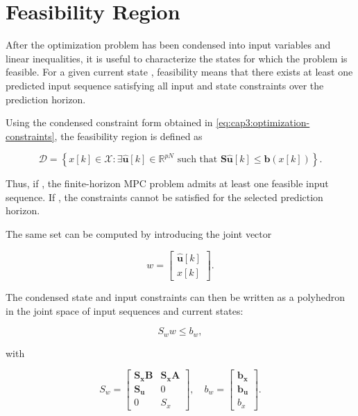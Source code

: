 \section{Feasibility Region}
\label{sec:cap3:feasibility-region}

After the optimization problem has been condensed into input variables and linear inequalities, it is useful to characterize the states for which the problem is feasible. For a given current state , feasibility means that there exists at least one predicted input sequence  satisfying all input and state constraints over the prediction horizon.

Using the condensed constraint form obtained in \eqref{eq:cap3:optimization-constraints}, the feasibility region is defined as

\noindent
\begin{equation}
    \mathcal{D} =
    \left\{
        x[k] \in \mathcal{X} :
        \exists \mathbf{\hat{u}}[k] \in \mathbb{R}^{pN}
        \text{ such that }
        \mathbf{S}\mathbf{\hat{u}}[k] \le \mathbf{b}(x[k])
    \right\}.
\end{equation}

\noindent
Thus, if , the finite-horizon MPC problem admits at least one feasible input sequence. If , the constraints cannot be satisfied for the selected prediction horizon.

The same set can be computed by introducing the joint vector

\noindent
\begin{equation}
    w =
    \left[
        \begin{matrix}
            \mathbf{\hat{u}}[k] \\
            x[k]
        \end{matrix}
    \right].
\end{equation}

\noindent
The condensed state and input constraints can then be written as a polyhedron in the joint space of input sequences and current states:

\noindent
\begin{equation}
    S_w w \le b_w,
\end{equation}

\noindent
with

\noindent
\begin{equation}
    S_w =
    \left[
        \begin{matrix}
            \mathbf{S_x} \mathbf{B} & \mathbf{S_x} \mathbf{A} \\
            \mathbf{S_u} & 0 \\
            0 & S_x
        \end{matrix}
    \right],
    \quad
    b_w =
    \left[
        \begin{matrix}
            \mathbf{b_x} \\
            \mathbf{b_u} \\
            b_x
        \end{matrix}
    \right].
\end{equation}

